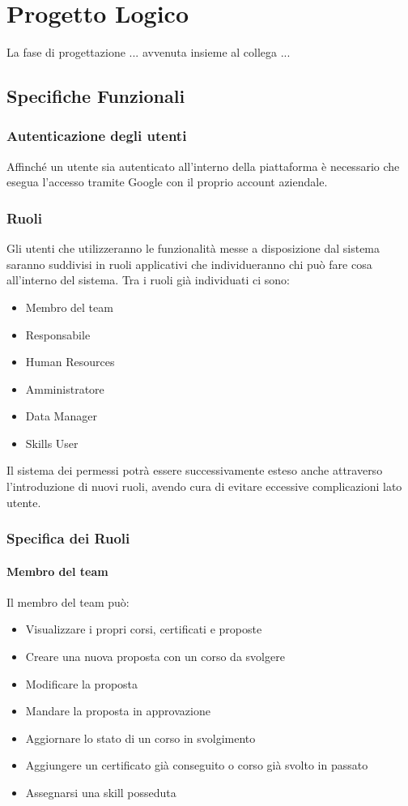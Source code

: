 \chapter{Progetto Logico}

La fase di progettazione ... avvenuta insieme al collega ... 

\section{Specifiche Funzionali}

\subsection{Autenticazione degli utenti}
Affinché un utente sia autenticato all’interno della piattaforma è necessario che esegua l’accesso tramite Google con il proprio account aziendale.

\subsection{Ruoli}
\label{ruoli}
Gli utenti che utilizzeranno le funzionalità messe a disposizione dal sistema saranno suddivisi in ruoli applicativi che individueranno chi può fare cosa all’interno del sistema. Tra i ruoli già individuati ci sono:
\begin{itemize}
    \item Membro del team
    \item Responsabile
    \item Human Resources
    \item Amministratore
    \item Data Manager
    \item Skills User
\end{itemize}
Il sistema dei permessi potrà essere successivamente esteso anche attraverso l’introduzione di nuovi ruoli, avendo cura di evitare eccessive complicazioni lato utente.

\subsection{Specifica dei Ruoli}
\subsubsection{Membro del team}
Il membro del team può:
\begin{itemize}
    \item Visualizzare i propri corsi, certificati e proposte
    \item Creare una nuova proposta con un corso da svolgere
    \item Modificare la proposta
    \item Mandare la proposta in approvazione
    \item Aggiornare lo stato di un corso in svolgimento
    \item Aggiungere un certificato già conseguito o corso già svolto in passato
    \item Assegnarsi una skill posseduta
\end{itemize}

